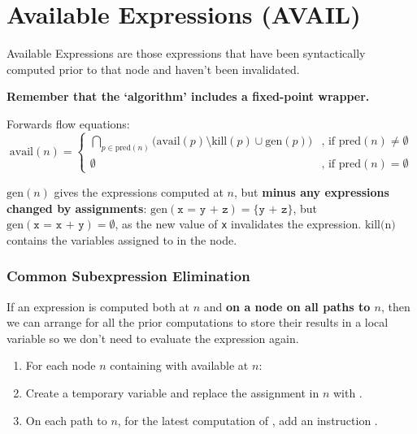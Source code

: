 \documentclass[a4paper, 11pt]{article}
\begin{document}
\section*{Available Expressions (AVAIL)}
{
    Available Expressions are those expressions that have been syntactically computed prior to that node and haven't been invalidated.

    \textbf{Remember that the `algorithm' includes a fixed-point wrapper.}

    Forwards flow equations:
    \begin{equation*}
    \text{avail}(n) =
    \begin{cases}
    \bigcap_{p \in \text{pred}(n)}{\big(\text{avail}(p) \setminus \text{kill}(p) \cup \text{gen}(p)\big)} &\text{, if pred}(n) \neq \emptyset \\
    \emptyset &\text{, if pred}(n) = \emptyset
    \end{cases}
    \end{equation*}

    \(\text{gen}(n)\) gives the expressions computed at \(n\), but \textbf{minus any expressions changed by assignments}: \(\text{gen}(\texttt{x = y + z}) = \{\texttt{y + z}\}\), but \(\text{gen}(\texttt{x = x + y}) = \emptyset\), as the new value of \texttt{x} invalidates the expression. \(\text{kill(n)}\) contains the variables assigned to in the node.

    \subsubsection*{Common Subexpression Elimination}
    {
        If an expression is computed both at \(n\) and \textbf{on a node on all paths to \(n\)}, then we can arrange for all the prior computations to store their results in a local variable so we don't need to evaluate the expression again.

        \begin{enumerate}
        \item For each node \(n\) containing  with  available at \(n\):
        \item Create a temporary variable  and replace the assignment in \(n\) with .
        \item On each path to \(n\), for the latest computation of , add an instruction .
        \end{enumerate}

}}
\end{document}
